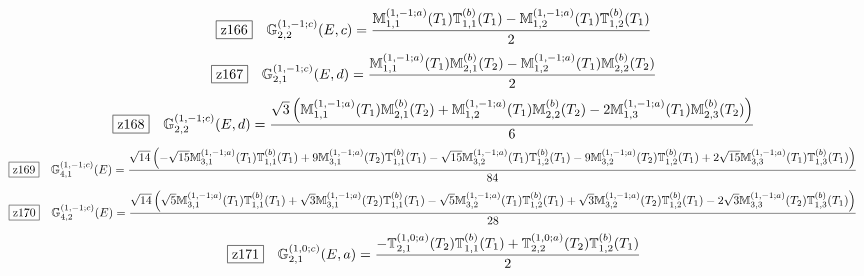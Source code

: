 \documentclass[fleqn,10pt,landscape]{jsarticle}
\begin{document}
\begin{dmath*}
\hspace*{3mm}\fbox{z166}\quad \mathbb{G}_{2,2}^{(1,-1;c)}(E,c)=\frac{\mathbb{M}_{1,1}^{(1,-1;a)}(T_{1}) \mathbb{T}_{1,1}^{(b)}(T_{1}) - \mathbb{M}_{1,2}^{(1,-1;a)}(T_{1}) \mathbb{T}_{1,2}^{(b)}(T_{1})}{2}
\end{dmath*}
\begin{dmath*}
\hspace*{3mm}\fbox{z167}\quad \mathbb{G}_{2,1}^{(1,-1;c)}(E,d)=\frac{\mathbb{M}_{1,1}^{(1,-1;a)}(T_{1}) \mathbb{M}_{2,1}^{(b)}(T_{2}) - \mathbb{M}_{1,2}^{(1,-1;a)}(T_{1}) \mathbb{M}_{2,2}^{(b)}(T_{2})}{2}
\end{dmath*}
\begin{dmath*}
\hspace*{3mm}\fbox{z168}\quad \mathbb{G}_{2,2}^{(1,-1;c)}(E,d)=\frac{\sqrt{3} \left(\mathbb{M}_{1,1}^{(1,-1;a)}(T_{1}) \mathbb{M}_{2,1}^{(b)}(T_{2}) + \mathbb{M}_{1,2}^{(1,-1;a)}(T_{1}) \mathbb{M}_{2,2}^{(b)}(T_{2}) - 2 \mathbb{M}_{1,3}^{(1,-1;a)}(T_{1}) \mathbb{M}_{2,3}^{(b)}(T_{2})\right)}{6}
\end{dmath*}
\begin{dmath*}
\hspace*{3mm}\fbox{z169}\quad \mathbb{G}_{4,1}^{(1,-1;c)}(E)=\frac{\sqrt{14} \left(- \sqrt{15} \mathbb{M}_{3,1}^{(1,-1;a)}(T_{1}) \mathbb{T}_{1,1}^{(b)}(T_{1}) + 9 \mathbb{M}_{3,1}^{(1,-1;a)}(T_{2}) \mathbb{T}_{1,1}^{(b)}(T_{1}) - \sqrt{15} \mathbb{M}_{3,2}^{(1,-1;a)}(T_{1}) \mathbb{T}_{1,2}^{(b)}(T_{1}) - 9 \mathbb{M}_{3,2}^{(1,-1;a)}(T_{2}) \mathbb{T}_{1,2}^{(b)}(T_{1}) + 2 \sqrt{15} \mathbb{M}_{3,3}^{(1,-1;a)}(T_{1}) \mathbb{T}_{1,3}^{(b)}(T_{1})\right)}{84}
\end{dmath*}
\begin{dmath*}
\hspace*{3mm}\fbox{z170}\quad \mathbb{G}_{4,2}^{(1,-1;c)}(E)=\frac{\sqrt{14} \left(\sqrt{5} \mathbb{M}_{3,1}^{(1,-1;a)}(T_{1}) \mathbb{T}_{1,1}^{(b)}(T_{1}) + \sqrt{3} \mathbb{M}_{3,1}^{(1,-1;a)}(T_{2}) \mathbb{T}_{1,1}^{(b)}(T_{1}) - \sqrt{5} \mathbb{M}_{3,2}^{(1,-1;a)}(T_{1}) \mathbb{T}_{1,2}^{(b)}(T_{1}) + \sqrt{3} \mathbb{M}_{3,2}^{(1,-1;a)}(T_{2}) \mathbb{T}_{1,2}^{(b)}(T_{1}) - 2 \sqrt{3} \mathbb{M}_{3,3}^{(1,-1;a)}(T_{2}) \mathbb{T}_{1,3}^{(b)}(T_{1})\right)}{28}
\end{dmath*}
\begin{dmath*}
\hspace*{3mm}\fbox{z171}\quad \mathbb{G}_{2,1}^{(1,0;c)}(E,a)=\frac{- \mathbb{T}_{2,1}^{(1,0;a)}(T_{2}) \mathbb{T}_{1,1}^{(b)}(T_{1}) + \mathbb{T}_{2,2}^{(1,0;a)}(T_{2}) \mathbb{T}_{1,2}^{(b)}(T_{1})}{2}
\end{dmath*}
\end{document}
